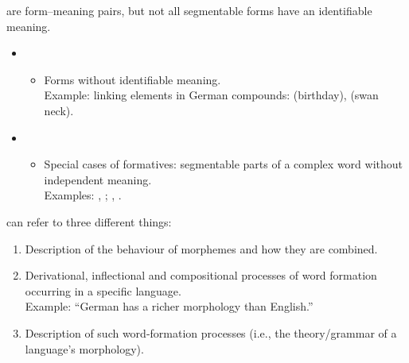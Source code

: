 \documentclass[a4paper,landscape,headrule,footrule]{foils}
\begin{document}
   are form–meaning pairs, but not all segmentable forms have an identifiable meaning.
  \begin{itemize}
  \item {}\\
    \begin{itemize}
    \item Forms without identifiable meaning.\\
      Example: linking elements in German compounds:  (birthday),  (swan neck).
    \end{itemize}
  \item {}\\
    \begin{itemize}
    \item Special cases of formatives: segmentable parts of a complex word without independent meaning.\\
      Examples: , ; , .
    \end{itemize}
  \end{itemize}


   can refer to three different things:
  \begin{enumerate}
    \item Description of the behaviour of morphemes and how they are combined.
    \item Derivational, inflectional and compositional processes of word formation occurring in a specific language.\\
          Example: ``German has a richer morphology than English.''
    \item Description of such word-formation processes (i.e., the theory/grammar of a language’s morphology).
    \end{enumerate}

\end{document}
